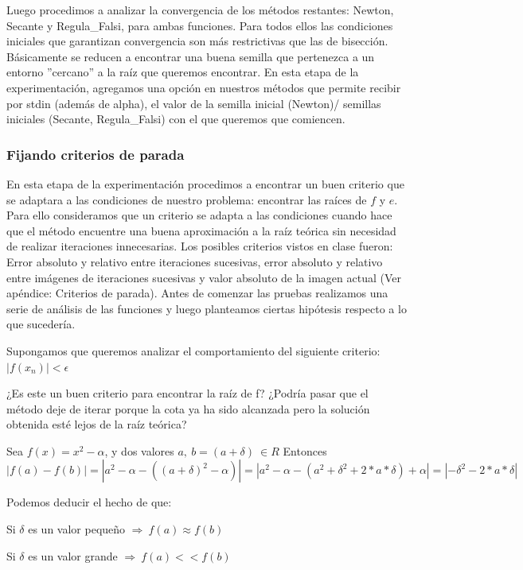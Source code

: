 Luego procedimos a analizar la convergencia de los métodos restantes: Newton, Secante y Regula\_Falsi, para ambas funciones. Para todos ellos las condiciones iniciales que garantizan
convergencia son más restrictivas que las de bisección. Básicamente se reducen a encontrar una buena semilla que pertenezca a un entorno ''cercano'' a la raíz que queremos encontrar.
En esta etapa de la experimentación, agregamos una opción en nuestros métodos que permite recibir por stdin (además de alpha), el valor de la semilla inicial (Newton)/ semillas iniciales (Secante, Regula\_Falsi)
con el que queremos que comiencen. 


\subsubsection{Fijando criterios de parada}

En esta etapa de la experimentación procedimos a encontrar un buen criterio que se adaptara a las condiciones de nuestro problema: encontrar las raíces de $f$ y $e$.
Para ello consideramos que un criterio se adapta a las condiciones cuando hace que el método encuentre una buena aproximación a la raíz
teórica sin necesidad de realizar iteraciones innecesarias. 
Los posibles criterios vistos en clase fueron: Error absoluto y relativo entre iteraciones sucesivas, error absoluto y relativo entre imágenes de iteraciones sucesivas y
valor absoluto de la imagen actual (Ver apéndice: Criterios de parada).
Antes de comenzar las pruebas realizamos una serie de análisis de las funciones y luego planteamos ciertas hipótesis respecto a lo que sucedería.

Supongamos que queremos analizar el comportamiento del siguiente criterio:
$|f(x_{n})| < \epsilon $

¿Es este un buen criterio para encontrar la raíz de f? ¿Podría pasar que el método deje de iterar porque la cota ya ha sido alcanzada pero la solución obtenida esté lejos de la 
raíz teórica?

Sea $f(x) = x^{2} - \alpha$, y dos valores $a, \ b=(a+\delta) \  \in R$ Entonces $|f(a) - f(b)| = |a^{2} - \alpha - ((a+\delta)^{2} - \alpha )| = |a^{2} - \alpha - (a^{2}+\delta^{2}+2*a*\delta) + \alpha | =
|-\delta^{2}-2*a*\delta|$

Podemos deducir el hecho de que:

Si $\delta$ es un valor peque\~no $\Rightarrow \ f(a) \approx f(b) $

Si $\delta$ es un valor grande $\Rightarrow \ f(a) << f(b) $

